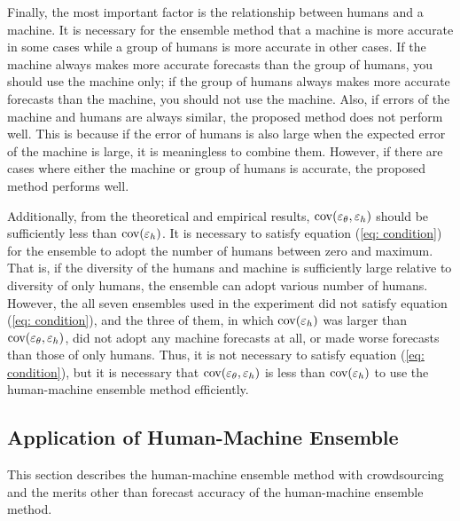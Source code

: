 \documentclass[../main.tex]{subfiles}
\begin{document}
Finally, the most important factor is the relationship between humans and a machine.
It is necessary for the ensemble method that a machine is more accurate in some cases while a group of humans is more accurate in other cases.
If the machine always makes more accurate forecasts than the group of humans, you should use the machine only; if the group of humans always makes more accurate forecasts than the machine, you should not use the machine.
Also, if errors of the machine and humans are always similar, the proposed method does not perform well.
This is because if the error of humans is also large when the expected error of the machine is large, it is meaningless to combine them.
However, if there are cases where either the machine or group of humans is accurate, the proposed method performs well.

Additionally, from the theoretical and empirical results, $\operatorname{cov}(\varepsilon_\theta, \varepsilon_h)$ should be sufficiently less than $\operatorname{cov}(\varepsilon_h)$.
It is necessary to satisfy equation (\ref{eq: condition}) for the ensemble to adopt the number of humans between zero and maximum.
That is, if the diversity of the humans and machine is sufficiently large relative to diversity of only humans, the ensemble can adopt various number of humans.
However, the all seven ensembles used in the experiment did not satisfy equation (\ref{eq: condition}), and the three of them, in which $\operatorname{cov}(\varepsilon_h)$ was larger than $\operatorname{cov}(\varepsilon_\theta, \varepsilon_h)$, did not adopt any machine forecasts at all, or made worse forecasts than those of only humans.
Thus, it is not necessary to satisfy equation (\ref{eq: condition}), but it is necessary that $\operatorname{cov}(\varepsilon_\theta, \varepsilon_h)$ is less than $\operatorname{cov}(\varepsilon_h)$ to use the human-machine ensemble method efficiently.

\subsection{Application of Human-Machine Ensemble}

This section describes the human-machine ensemble method with crowdsourcing and the merits other than forecast accuracy of the human-machine ensemble method.
\end{document}

